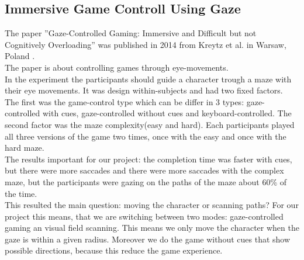\documentclass{sigchi}
\begin{document}
\subsection{Immersive Game Controll Using Gaze}
The paper ''Gaze-Controlled Gaming: Immersive and Difficult but not Cognitively Overloading'' was published in 2014 from Kreytz et al. in Warsaw, Poland \cite{krejtz2014gaze}.\\
The paper is about controlling games through eye-movements.\\
In the experiment the participants should guide a character trough a maze with their eye movements. It was design within-subjects and had two fixed factors. The first was the game-control type which can be differ in 3 types: gaze-controlled with cues, gaze-controlled without cues and keyboard-controlled. The second factor was the maze complexity(easy and hard). Each participants played all three versions of the game two times, once with the easy and once with the hard maze.\\
The results important for our project: the completion time was faster with cues, but there were more saccades and there were more saccades with the complex maze, but the participants were gazing on the paths of the maze about 60\% of the time.\\
This resulted the main question: moving the character or scanning paths? For our project this means, that we are switching between two modes: gaze-controlled gaming an visual field scanning. This means we only move the character when the gaze is within a given radius. Moreover we do the game without cues that show possible directions, because this reduce the game experience. 
\end{document}
